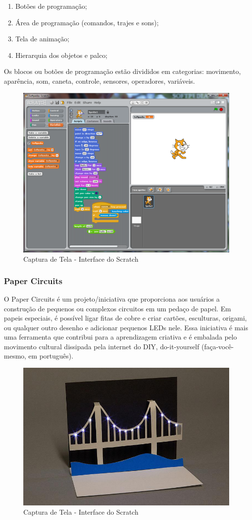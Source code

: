 \begin{enumerate}
  \item Botões de programação;
  \item Área de programação (comandos, trajes e sons);
  \item Tela de animação;
  \item Hierarquia dos objetos e palco;
\end{enumerate}

Os blocos ou botões de programação estão divididos em categorias: movimento, aparência, som, caneta, controle, sensores, operadores, variáveis.

\begin{figure}[!ht]
\centering
\includegraphics[width=.5\textwidth]{edit/img/scratch.png}
\caption{Captura de Tela - Interface do Scratch}
\label{scratch}
\end{figure}

\subsubsection{Paper Circuits}

O Paper Circuits é um projeto/iniciativa que proporciona aos usuários a construção de pequenos ou complexos circuitos em um pedaço de papel. Em papeis especiais, é possível ligar fitas de cobre e criar cartões, esculturas, origami, ou qualquer outro desenho e adicionar pequenos LEDs nele.
Essa iniciativa é mais uma ferramenta que contribui para a aprendizagem criativa e é embalada pelo movimento cultural dissipada pela internet do DIY, do-it-yourself (faça-você-mesmo, em português).

\begin{figure}[!ht]
\centering
\includegraphics[width=.5\textwidth]{edit/img/circuitpaper.jpg}
\caption{Captura de Tela - Interface do Scratch}
\label{fig:exampleFig1}
\end{figure}

